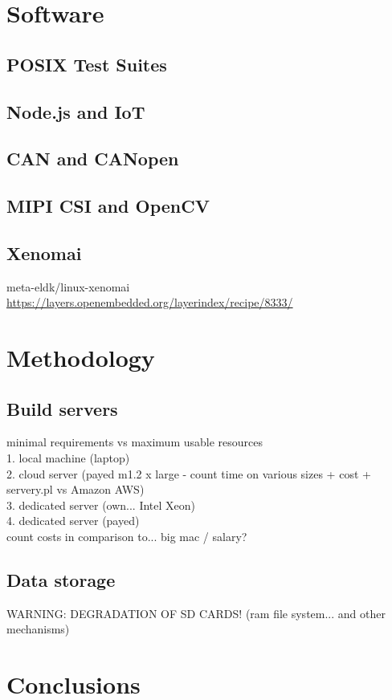 \documentclass[printmode]{mgr}
\begin{document}
\chapter{Software}
\label{chapter:software}

\section{POSIX Test Suites}

\section{Node.js and IoT}

\section{CAN and CANopen}

\section{MIPI CSI and OpenCV}

\section{Xenomai}

meta-eldk/linux-xenomai
\url{https://layers.openembedded.org/layerindex/recipe/8333/}

\chapter{Methodology}
\label{chapter:methodology}

\section{Build servers}
minimal requirements vs maximum usable resources\\
1. local machine (laptop)\\
2. cloud server (payed m1.2 x large - count time on various sizes + cost + servery.pl vs Amazon AWS)\\
3. dedicated server (own... Intel Xeon)\\
4. dedicated server (payed)\\
count costs in comparison to... big mac / salary?

\section{Data storage}
WARNING: DEGRADATION OF SD CARDS! (ram file system... and other mechanisms)

\chapter{Conclusions}
\label{chapter:conclusions}



\listoffigures
\listoftables
\end{document}
